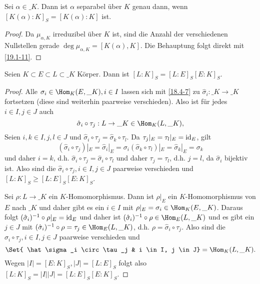 \begin{kor} \label{19.1-12}
	Sei $\alpha \in \_K$.
	Dann ist $\alpha$ separabel über $K$ genau dann, wenn $[K(\alpha) : K]_S = [K(\alpha) : K]$ ist.
	\begin{proof}
		Da $\mu_{\alpha, K}$ irreduzibel über $K$ ist, sind die Anzahl der verschiedenen Nullstellen gerade $\deg \mu_{\alpha, K} = [K(\alpha), K]$.
		Die Behauptung folgt direkt mit \ref{19.1-11}.
	\end{proof}
\end{kor}

\begin{st} \label{19.1-13}
	Seien $K \subset E \subset L \subset \_K$ Körper.
	Dann ist $[L : K]_S = [L : E]_S [E : K]_S$.
	\begin{proof}
		Alle $\sigma_i \in \Hom_{K}(E, \_K), i \in I$ lassen sich mit \ref{18.4-7} zu $\hat \sigma_i: \_K \to \_K$ fortsetzen (diese sind weiterhin paarweise verschieden).
		Also ist für jedes $i \in I, j \in J$ auch
		\[
			\hat \sigma_i \circ \tau_j: L \to \_K \in \Hom_K(L, \_K),
		\]
		Seien $i, k \in I, j, l \in J$ und $\hat \sigma_i \circ \tau_j = \hat \sigma_k \circ \tau_l$.
		Da $\tau_j|_E = \tau_l|_E = \operatorname{id}_E$, gilt
		\[
			(\hat \sigma_i \circ \tau_j)|_E = \hat \sigma_i|_E = \sigma_i
			(\hat \sigma_k \circ \tau_l)|_E = \hat \sigma_k|_E = \sigma_k
		\]
		und daher $i = k$, d.h. $\hat \sigma_i \circ \tau_j = \hat \sigma_i \circ \tau_l$ und daher $\tau_j = \tau_l$, d.h. $j = l$, da $\hat \sigma_i$ bijektiv ist.
		Also sind die $\hat \sigma_i \circ \tau_j, i \in I, j \in J$ paarweise verschieden und $[L:K]_S \ge [L:E]_S [E:K]_S$.

		Sei $\rho: L \to \_K$ ein $K$-Homomorphismus.
		Dann ist $\rho|_E$ ein $K$-Homomorphismus von $E$ nach $\_K$ und daher gibt es ein $i \in I$ mit $\rho|_E = \sigma_i \in \Hom_K(E, \_K)$.
		Daraus folgt $(\hat \sigma_i)^{-1} \circ \rho|_E = \operatorname{id}_E$ und daher ist $(\hat \sigma_i)^{-1} \circ \rho \in \Hom_E (L, \_K)$ und es gibt ein $j \in J$ mit $(\hat \sigma_i)^{-1} \circ \rho = \tau_j \in \Hom_E (L, \_K)$, d.h. $\rho = \hat \sigma_i \circ \tau_j$.
		Also sind die $\hat \sigma_i \circ \tau_j, i \in I, j \in J$ paarweise verschieden und
		\[
			\Set{ \hat \sigma_i \circ \tau_j & i \in I, j \in J}
			= \Hom_K(L, \_K).
		\]
		Wegen $|I| = [E : K]_S, |J| = [L: E]_S$ folgt also $[L:K]_S = |I| |J| = [L:E]_S [E:K]_S$.
	\end{proof}
\end{st}

